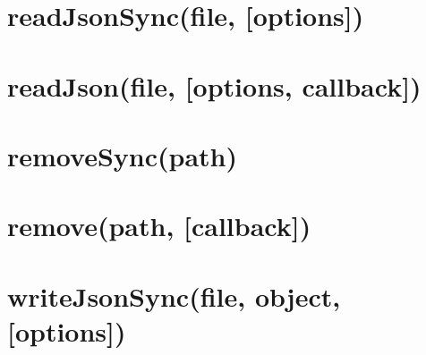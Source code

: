 \documentclass[twoside]{book}
\newcommand{\+}{\discretionary{\mbox{\scriptsize$\hookleftarrow$}}{}{}}
\begin{document}
\chapter{read\+Json\+Sync(file, \mbox{[}options\mbox{]})}
\label{md_dsmacc_examples_DRmerge_node_modules_electron-packager_node_modules_fs-extra_docs_readJson-sync}

\chapter{read\+Json(file, \mbox{[}options, callback\mbox{]})}
\label{md_dsmacc_examples_DRmerge_node_modules_electron-packager_node_modules_fs-extra_docs_readJson}

\chapter{remove\+Sync(path)}
\label{md_dsmacc_examples_DRmerge_node_modules_electron-packager_node_modules_fs-extra_docs_remove-sync}

\chapter{remove(path, \mbox{[}callback\mbox{]})}
\label{md_dsmacc_examples_DRmerge_node_modules_electron-packager_node_modules_fs-extra_docs_remove}

\chapter{write\+Json\+Sync(file, object, \mbox{[}options\mbox{]})}
\label{md_dsmacc_examples_DRmerge_node_modules_electron-packager_node_modules_fs-extra_docs_writeJson-sync}

\end{document}
